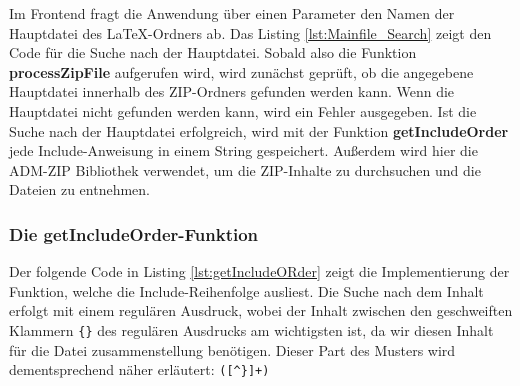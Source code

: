 Im Frontend fragt die Anwendung über einen Parameter den Namen der Hauptdatei des LaTeX-Ordners ab. Das Listing \ref{lst:Mainfile_Search} zeigt den Code für die Suche nach der Hauptdatei. Sobald also die Funktion \textbf{processZipFile} aufgerufen wird, wird zunächst geprüft, ob die angegebene Hauptdatei innerhalb des ZIP-Ordners gefunden werden kann. Wenn die Hauptdatei nicht gefunden werden kann, wird ein Fehler ausgegeben. Ist die Suche nach der Hauptdatei erfolgreich, wird mit der Funktion \textbf{getIncludeOrder} jede Include-Anweisung in einem String gespeichert. Außerdem wird hier die ADM-ZIP Bibliothek verwendet, um die ZIP-Inhalte zu durchsuchen und die Dateien zu entnehmen.


\subsubsection{Die getIncludeOrder-Funktion}

Der folgende Code in Listing \ref{lst:getIncludeORder} zeigt die Implementierung der Funktion, welche die Include-Reihenfolge ausliest. Die Suche nach dem Inhalt erfolgt mit einem regulären Ausdruck, wobei der Inhalt zwischen den geschweiften Klammern \texttt{\{\}} des regulären Ausdrucks am wichtigsten ist, da wir diesen Inhalt für die Datei zusammenstellung benötigen. Dieser Part des Musters wird dementsprechend näher erläutert: \texttt{([\textasciicircum\}]+)}

